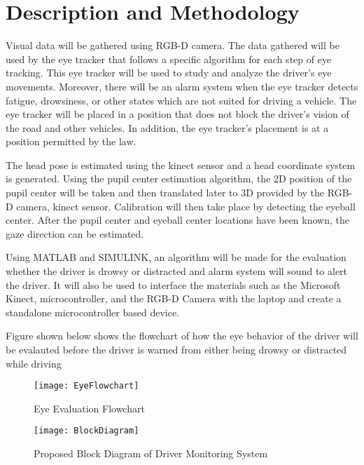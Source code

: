 \section{Description and Methodology}

Visual data will be gathered using RGB-D camera. The data gathered will be used by the eye tracker that follows a specific algorithm for each step of eye tracking. This eye tracker will be used to study and analyze the driver’s eye movements. Moreover, there will be an alarm system when the eye tracker detects fatigue, drowsiness, or other states which are not suited for driving a vehicle. The eye tracker will be placed in a position that does not block the driver’s vision of the road and other vehicles. In addition, the eye tracker’s placement is at a position permitted by the law.

The head pose is estimated using the kinect sensor and a head coordinate system is generated. Using the pupil center estimation algorithm, the 2D position of the pupil center will be taken and then translated later to 3D provided by the RGB-D camera, kinect sensor. Calibration will then take place by detecting the eyeball center. After the pupil center and eyeball center locations have been known, the gaze direction can be estimated.

Using MATLAB and SIMULINK, an algorithm will be made for the evaluation whether the driver is drowsy or distracted and alarm system will sound to alert the driver. It will also be used to interface the materials such as the Microsoft Kinect, microcontroller, and the RGB-D Camera with the laptop and create a standalone microcontroller based device. 

Figure shown below shows the flowchart of how the eye behavior of the driver will be evalauted before the driver is warned from either being drowsy or distracted while driving
\begin{center}
\begin{figure}[ht]
	\centering
	\texttt{[image: EyeFlowchart]}
	\caption{Eye Evaluation Flowchart}
\end{figure}


\end{center}

\begin{center}
	\begin{figure}[ht]
		\centering
		\texttt{[image: BlockDiagram]}
		\caption{Proposed Block Diagram of Driver Monitoring System}
	\end{figure}
\end{center}
\newpage
